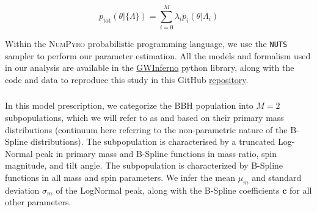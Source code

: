 \begin{equation} \label{totmixmod}
p_\text{tot}(\theta|\{\Lambda\}) = \sum_{i=0}^{M} \lambda_i p_i(\theta | \Lambda_i)
\end{equation}

Within the \textsc{NumPyro} \citep{1810.09538,1912.11554} probabilistic programming language, we use the \texttt{NUTS} \citep{1111.4246} sampler to perform our parameter estimation. All the models and formalism used in our analysis are available in the \href{https://github.com/FarrOutLab/GWInferno}{GWInferno} python library, along with the code and data to reproduce this study in this GitHub \href{https://github.com/jaxeng/CosmicCousins}{repository}. 

\subsubsection{\base{}}
In this model prescription, we categorize the BBH population into $M=2$ subpopulations, which we will refer to as \first{} and \contB{} based on their primary mass distributions (continuum here referring to the non-parametric nature of the B-Spline distributions). The \first{} subpopulation is characterised by a truncated Log-Normal peak in primary mass and B-Spline functions in mass ratio, spin magnitude, and tilt angle. The \contB{} subpopulation is characterized by B-Spline functions in all mass and spin parameters. We infer the mean $\mu_m$ and standard deviation $\sigma_m$ of the LogNormal peak, along with the B-Spline coefficients $\mathbf{c}$ for all other parameters.

